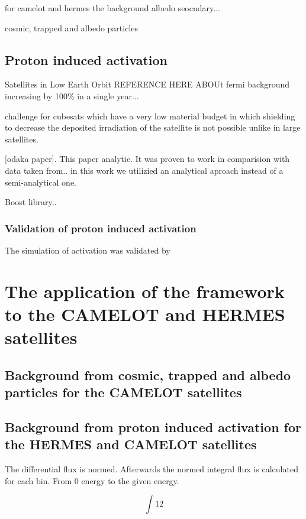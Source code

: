 \documentclass[12pt]{spieman}  %
\begin{document}
\begin{spacing}{2}
for camelot and hermes the background albedo seocndary...



cosmic, trapped and albedo particles


\subsection{Proton induced activation} 


Satellites in Low Earth Orbit REFERENCE HERE ABOUt fermi background increasing by 100\% in a single year...

challenge for cubesats which have a very low material budget in which shielding to decrease the deposited irradiation of the satellite is not possible unlike in large satellites.

[odaka paper]. This paper analytic. It was proven to work in comparision with data taken from.. in this work we utilizied an analytical aproach instead of a semi-analytical one.

Boost library..

\subsubsection{Validation of proton induced activation} 

The simulation of activation was validated by 


\section{The application of the framework to the CAMELOT and HERMES satellites}

\subsection{Background from cosmic, trapped and albedo particles for the CAMELOT satellites} 



\subsection{Background from proton induced activation for the HERMES and CAMELOT satellites}  
 
\newpage 
 
The differential flux is normed. Afterwards the normed integral flux is calculated for each bin. From 0 energy to the given energy.

$$ \int{1}{2} $$
 

\end{spacing}
\end{document}
